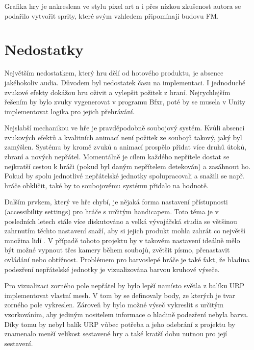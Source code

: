 \documentclass[FM,Proj]{tulthesis}
\begin{document}
	Grafika hry je nakreslena ve stylu pixel art a i přes nízkou zkušenost autora se podařilo vytvořit sprity, které svým vzhledem připomínají budovu FM.
	
	\section{Nedostatky} %
	
	Největším nedostatkem, který hru dělí od hotového produktu, je absence jakéhokoliv audia. Důvodem byl nedostatek času na implementaci. I jednoduché zvukové efekty dokážou hru oživit a vylepšit požitek z hraní. Nejrychlejším řešením by bylo zvuky vygenerovat v programu Bfxr, poté by se musela v Unity implementovat logika pro jejich přehrávání.
	
	Nejslabší mechanikou ve hře je pravděpodobně soubojový systém. Kvůli absenci zvukových efektů a kvalitních animací není požitek ze soubojů takový, jaký byl zamýšlen. Systému by kromě zvuků a animací prospělo přidat více druhů útoků, zbraní a nových nepřátel. Momentálně je cílem každého nepřítele dostat se nejkratší cestou k hráči (pokud byl daným nepřítelem detekován) a zasáhnout ho. Pokud by spolu jednotlivé nepřátelské jednotky spolupracovali a snažili se např. hráče obklíčit, také by to soubojovému systému přidalo na hodnotě.
	
	Dalším prvkem, který ve hře chybí, je nějaká forma nastavení přístupnosti (accessibility settings) pro hráče s určitým handicapem. Toto téma je v posledních letech stále více diskutováno a velká vývojářská studia se většinou zahrnutím těchto nastavení snaží, aby si jejich produkt mohla zahrát co největší množina lidí \cite{disability}. V případě tohoto projektu by v takovém nastavení ideálně mělo být možné vypnout třes kamery během soubojů, zvětšit písmo, přenastavit ovládání nebo obtížnost. Problémem pro barvoslepé hráče je také fakt, že hladina podezření nepřátelské jednotky je vizualizována barvou kruhové výseče.
	
	
	Pro vizualizaci zorného pole nepřátel by bylo lepší namísto světla z balíku URP implementovat vlastní mesh. V tom by se definovaly body, ze kterých je tvar zorného pole vykreslen. Zároveň by bylo možné výseč vykreslit s určitým vzorkováním, aby jediným nositelem informace o hladině podezření nebyla barva. Díky tomu by nebyl balík URP vůbec potřeba a jeho odebrání z projektu by znamenalo menší velikost sestavené hry a také kratší dobu nutnou pro její sestavení.
	
\end{document}
